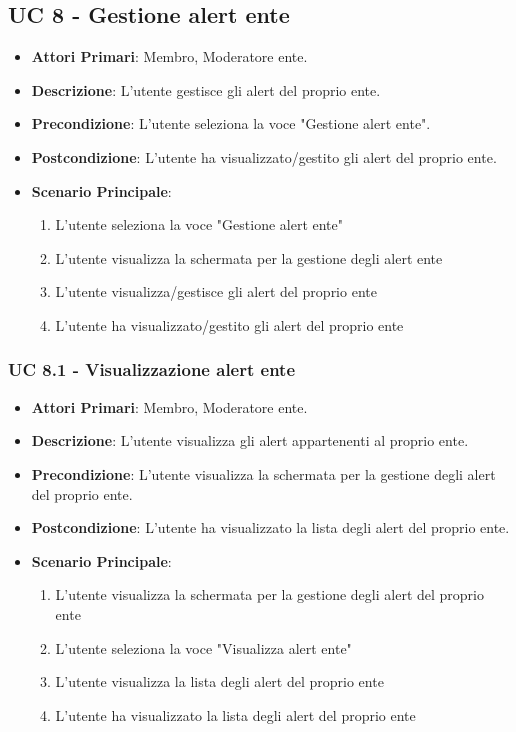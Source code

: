 	\subsection{UC 8 - Gestione alert ente}
			
		\begin{itemize}
			\item \textbf{Attori Primari}: Membro, Moderatore ente.
			\item \textbf{Descrizione}: L'utente gestisce gli alert del proprio ente.
			\item \textbf{Precondizione}: L'utente seleziona la voce "Gestione alert ente".
			\item \textbf{Postcondizione}: L'utente ha visualizzato/gestito gli alert del proprio ente.
			\item \textbf{Scenario Principale}:
			\begin{enumerate}
				\item{L'utente seleziona la voce "Gestione alert ente"}
				\item{L'utente visualizza la schermata per la gestione degli alert ente}
				\item{L'utente visualizza/gestisce gli alert del proprio ente}
				\item{L'utente ha visualizzato/gestito gli alert del proprio ente}
			\end{enumerate}	
		\end{itemize}
			
			\subsubsection{UC 8.1 - Visualizzazione alert ente}
			\begin{itemize}
				\item \textbf{Attori Primari}: Membro, Moderatore ente.
				\item \textbf{Descrizione}: L'utente visualizza gli alert appartenenti al proprio ente.
				\item \textbf{Precondizione}: L'utente visualizza la schermata per la gestione degli alert del proprio ente.
				\item \textbf{Postcondizione}: L'utente ha visualizzato la lista degli alert del proprio ente.
				\item \textbf{Scenario Principale}:
				\begin{enumerate}
					\item{L'utente visualizza la schermata per la gestione degli alert del proprio ente}
					\item{L'utente seleziona la voce "Visualizza alert ente"}
					\item{L'utente visualizza la lista degli alert del proprio ente}
					\item{L'utente ha visualizzato la lista degli alert del proprio ente}
				\end{enumerate}	
			\end{itemize}
			
